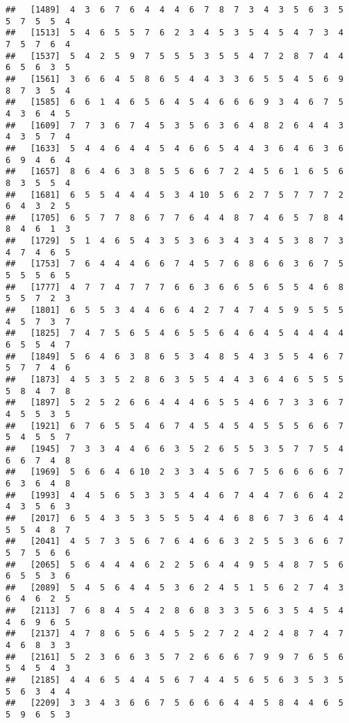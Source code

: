 \documentclass[
]{book}
\begin{document}
\begin{verbatim}
##   [1489]  4  3  6  7  6  4  4  4  6  7  8  7  3  4  3  5  6  3  5  5  7  5  5  4
##   [1513]  5  4  6  5  5  7  6  2  3  4  5  3  5  4  5  4  7  3  4  7  5  7  6  4
##   [1537]  5  4  2  5  9  7  5  5  5  3  5  5  4  7  2  8  7  4  4  6  5  6  3  5
##   [1561]  3  6  6  4  5  8  6  5  4  4  3  3  6  5  5  4  5  6  9  8  7  3  5  4
##   [1585]  6  6  1  4  6  5  6  4  5  4  6  6  6  9  3  4  6  7  5  4  3  6  4  5
##   [1609]  7  7  3  6  7  4  5  3  5  6  3  6  4  8  2  6  4  4  3  4  3  5  7  4
##   [1633]  5  4  4  6  4  4  5  4  6  6  5  4  4  3  6  4  6  3  6  6  9  4  6  4
##   [1657]  8  6  4  6  3  8  5  5  6  6  7  2  4  5  6  1  6  5  6  8  3  5  5  4
##   [1681]  6  5  5  4  4  4  5  3  4 10  5  6  2  7  5  7  7  7  2  6  4  3  2  5
##   [1705]  6  5  7  7  8  6  7  7  6  4  4  8  7  4  6  5  7  8  4  8  4  6  1  3
##   [1729]  5  1  4  6  5  4  3  5  3  6  3  4  3  4  5  3  8  7  3  4  7  4  6  5
##   [1753]  7  6  4  4  4  6  6  7  4  5  7  6  8  6  6  3  6  7  5  5  5  5  6  5
##   [1777]  4  7  7  4  7  7  7  6  6  3  6  6  5  6  5  5  4  6  8  5  5  7  2  3
##   [1801]  6  5  5  3  4  4  6  6  4  2  7  4  7  4  5  9  5  5  5  4  5  7  3  7
##   [1825]  7  4  7  5  6  5  4  6  5  5  6  4  6  4  5  4  4  4  4  6  5  5  4  7
##   [1849]  5  6  4  6  3  8  6  5  3  4  8  5  4  3  5  5  4  6  7  5  7  7  4  6
##   [1873]  4  5  3  5  2  8  6  3  5  5  4  4  3  6  4  6  5  5  5  5  8  4  7  8
##   [1897]  5  2  5  2  6  6  4  4  4  6  5  5  4  6  7  3  3  6  7  4  5  5  3  5
##   [1921]  6  7  6  5  5  4  6  7  4  5  4  5  4  5  5  5  6  6  7  5  4  5  5  7
##   [1945]  7  3  3  4  4  6  6  3  5  2  6  5  5  3  5  7  7  5  4  6  6  7  4  8
##   [1969]  5  6  6  4  6 10  2  3  3  4  5  6  7  5  6  6  6  6  7  6  3  6  4  8
##   [1993]  4  4  5  6  5  3  3  5  4  4  6  7  4  4  7  6  6  4  2  4  3  5  6  3
##   [2017]  6  5  4  3  5  3  5  5  5  4  4  6  8  6  7  3  6  4  4  5  5  4  8  7
##   [2041]  4  5  7  3  5  6  7  6  4  6  6  3  2  5  5  3  6  6  7  5  7  5  6  6
##   [2065]  5  6  4  4  4  6  2  2  5  6  4  4  9  5  4  8  7  5  6  6  5  5  3  6
##   [2089]  5  4  5  6  4  4  5  3  6  2  4  5  1  5  6  2  7  4  3  6  4  6  2  5
##   [2113]  7  6  8  4  5  4  2  8  6  8  3  3  5  6  3  5  4  5  4  4  6  9  6  5
##   [2137]  4  7  8  6  5  6  4  5  5  2  7  2  4  2  4  8  7  4  7  4  6  8  3  3
##   [2161]  5  2  3  6  6  3  5  7  2  6  6  6  7  9  9  7  6  5  6  5  4  5  4  3
##   [2185]  4  4  6  5  4  4  5  6  7  4  4  5  6  5  6  3  5  3  5  5  6  3  4  4
##   [2209]  3  3  4  3  6  6  7  5  6  6  6  4  4  5  8  4  4  6  5  5  9  6  5  3

\end{verbatim}
\end{document}
